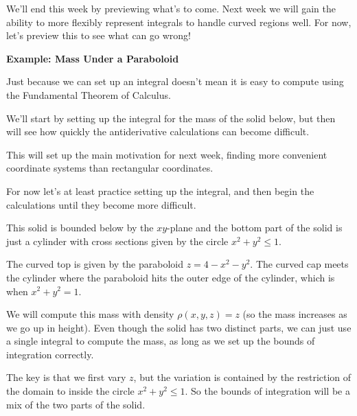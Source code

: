 \documentclass{ximera}
\begin{document}
We'll end this week by previewing what's to come. Next week we will gain the ability to more flexibly represent integrals to handle curved regions well. For now, let's preview this to see what can go wrong!

\begin{problem}
\textbf{Example: Mass Under a Paraboloid}

\begin{remark}
Just because we can set up an integral doesn't mean it is easy to compute using the Fundamental Theorem of Calculus.

We'll start by setting up the integral for the mass of the solid below, but then will see how quickly the antiderivative calculations can become difficult.

This will set up the main motivation for next week, finding more convenient coordinate systems than rectangular coordinates.
\end{remark}

For now let's at least practice setting up the integral, and then begin the calculations until they become more difficult.

This solid is bounded below by the $xy$-plane and the bottom part of the solid is just a cylinder with cross sections given by the circle $x^2+y^2 \leq 1$.

The curved top is given by the paraboloid $z = 4 - x^2 - y^2$. The curved cap meets the cylinder where the paraboloid hits the outer edge of the cylinder, which is when $x^2+y^2=1$.

We will compute this mass with density $\rho(x,y,z) = z$ (so the mass increases as we go up in height). Even though the solid has two distinct parts, we can just use a single integral to compute the mass, as long as we set up the bounds of integration correctly.

The key is that we first vary $z$, but the variation is contained by the restriction of the domain to inside the circle $x^2+y^2 \leq 1$. So the bounds of integration will be a mix of the two parts of the solid.

\begin{center}
\end{center}
\end{problem}
\end{document}
